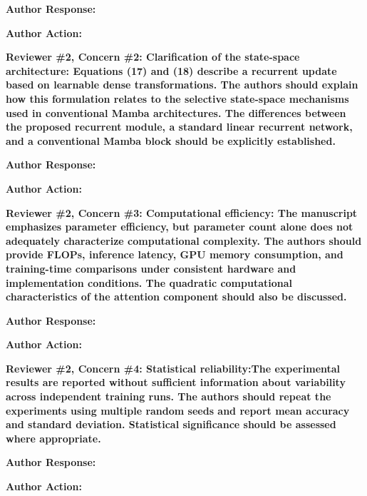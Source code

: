 \documentclass[a4paper,onecolumn,11pt]{IEEEtran}
\begin{document}
\textbf{Author Response:}



\textbf{Author Action:}



\vspace{1.5em}

{\color{reviewgreen}\textbf{Reviewer \#2, Concern \#2: Clarification of the state-space architecture: Equations (17) and (18) describe a recurrent update based on learnable dense transformations. The authors should explain how this formulation relates to the selective state-space mechanisms used in conventional Mamba architectures. The differences between the proposed recurrent module, a standard linear recurrent network, and a conventional Mamba block should be explicitly established.
}}

\textbf{Author Response:}



\textbf{Author Action:}



\vspace{1.5em}

{\color{reviewgreen}\textbf{Reviewer \#2, Concern \#3: Computational efficiency: The manuscript emphasizes parameter efficiency, but parameter count alone does not adequately characterize computational complexity. The authors should provide FLOPs, inference latency, GPU memory consumption, and training-time comparisons under consistent hardware and implementation conditions. The quadratic computational characteristics of the attention component should also be discussed.
}}

\textbf{Author Response:}



\textbf{Author Action:}



\vspace{1.5em}

{\color{reviewgreen}\textbf{Reviewer \#2, Concern \#4: Statistical reliability:The experimental results are reported without sufficient information about variability across independent training runs. The authors should repeat the experiments using multiple random seeds and report mean accuracy and standard deviation. Statistical significance should be assessed where appropriate.
}}

\textbf{Author Response:}



\textbf{Author Action:}
\end{document}
